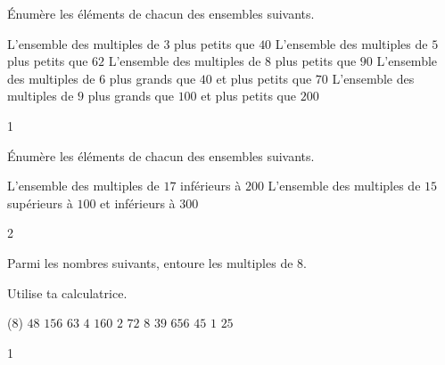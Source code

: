 \documentclass[a4paper,12pt]{report}
\begin{document}
\begin{exo}{
    Énumère les éléments de chacun des ensembles suivants.

\begin{tasks}[after-item-skip = 0.5em]
    \task L'ensemble des multiples de $3$ plus petits que $40$
    \task L'ensemble des multiples de $5$ plus petits que $62$
    \task L'ensemble des multiples de $8$ plus petits que $90$
    \task L'ensemble des multiples de $6$ plus grands que $40$ et plus petits que $70$
    \task L'ensemble des multiples de $9$ plus grands que $100$ et plus petits que $200$
\end{tasks}
}{1}\end{exo}


\begin{exo}{
    Énumère les éléments de chacun des ensembles suivants.
    \begin{tasks}[after-item-skip = 0.5em, after-skip=-1em]
    \task L'ensemble des multiples de $17$ inférieurs à $200$
    \task L'ensemble des multiples de $15$ supérieurs à $100$ et inférieurs à $300$
\end{tasks}
}{2}\end{exo}


\begin{exop}{
    Parmi les nombres suivants, entoure les multiples de $8$.

    Utilise ta calculatrice. 
    \begin{tasks}[after-item-skip = 0.5em](8)
\task[] $48 $
\task[] $156 $
\task[] $63 $
\task[] $4 $
\task[] $160$ 
\task[] $2$ 
\task[] $72$
\task[] $8$ 
\task[] $39$ 
\task[] $656$ 
\task[] $45$ 
\task[] $1$ 
\task[] $25$ 
    \end{tasks}
}{1}\end{exop}


\end{document}

